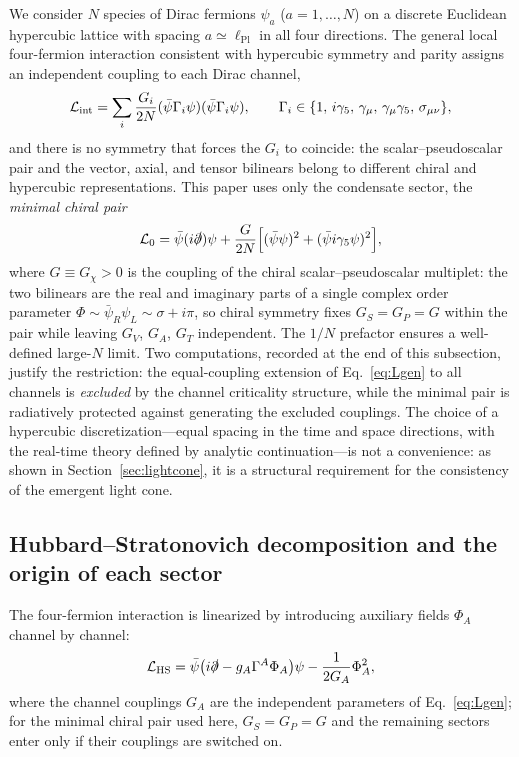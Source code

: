 \documentclass[11pt,a4paper]{article}
\begin{document}
We consider $N$ species of Dirac fermions $\psi_a$
($a = 1, \ldots, N$) on a discrete Euclidean hypercubic lattice
with spacing $a \simeq \ell_{\mathrm{Pl}}$ in all four directions.
The general local four-fermion interaction consistent with
hypercubic symmetry and parity assigns an independent coupling to
each Dirac channel,
\begin{equation}
\mathcal{L}_{\rm int} = \sum_{i}
\frac{G_i}{2N}(\bar{\psi}\Gamma_i\psi)(\bar{\psi}\Gamma_i\psi),
\qquad
\Gamma_i \in \{1,\, i\gamma_5,\, \gamma_\mu,\,
\gamma_\mu\gamma_5,\, \sigma_{\mu\nu}\},
\label{eq:Lgen}
\end{equation}
and there is no symmetry that forces the $G_i$ to coincide: the
scalar--pseudoscalar pair and the vector, axial, and tensor
bilinears belong to different chiral and hypercubic
representations.  This paper uses only the condensate sector, the
\emph{minimal chiral pair}
\begin{equation}
\mathcal{L}_0 = \bar{\psi}(i\slashed{\partial})\psi
+ \frac{G}{2N}\Bigl[(\bar{\psi}\psi)^2
+ (\bar{\psi}i\gamma_5\psi)^2\Bigr],
\label{eq:L0}
\end{equation}
where $G \equiv G_\chi > 0$ is the coupling of the chiral
scalar--pseudoscalar multiplet: the two bilinears are the real and
imaginary parts of a single complex order parameter
$\Phi \sim \bar\psi_R\psi_L \sim \sigma + i\pi$, so chiral symmetry
fixes $G_S = G_P = G$ within the pair while leaving
$G_V$, $G_A$, $G_T$ independent.
The $1/N$ prefactor ensures a well-defined large-$N$ limit.
Two computations, recorded at the end of this subsection, justify
the restriction: the equal-coupling extension of
Eq.~\eqref{eq:Lgen} to all channels is \emph{excluded} by the
channel criticality structure, while the minimal pair is
radiatively protected against generating the excluded couplings.
The choice of a hypercubic discretization---equal spacing in the
time and space directions, with the real-time theory defined by
analytic continuation---is not a convenience: as shown in
Section~\ref{sec:lightcone}, it is a structural requirement for
the consistency of the emergent light cone.

\subsection{Hubbard--Stratonovich decomposition and the origin of
each sector}

The four-fermion interaction is linearized by introducing
auxiliary fields $\Phi_A$ channel by channel:
\begin{equation}
\mathcal{L}_{\mathrm{HS}} = \bar{\psi}
\bigl(i\slashed{\partial} - g_A\Gamma^A\Phi_A\bigr)\psi
- \frac{1}{2G_A}\Phi_A^2,
\label{eq:HS}
\end{equation}
where the channel couplings $G_A$ are the independent parameters
of Eq.~\eqref{eq:Lgen}; for the minimal chiral pair used here,
$G_S = G_P = G$ and the remaining sectors enter only if their
couplings are switched on.
\end{document}
